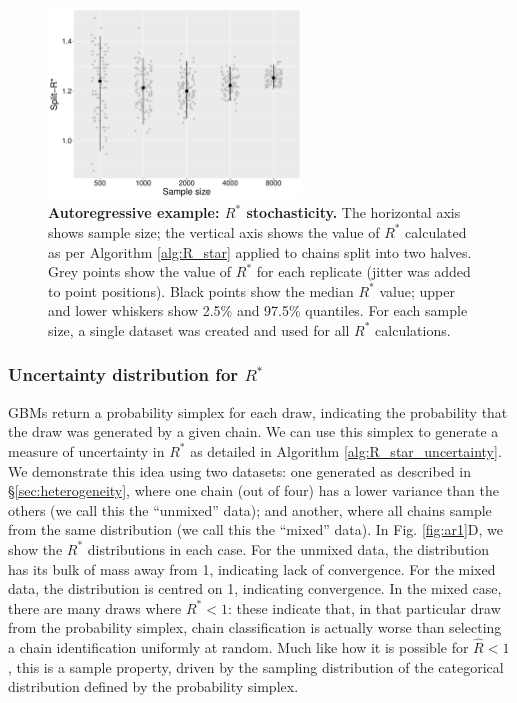 \documentclass[ba]{imsart}
\numberwithin{equation}{section}
\theoremstyle{plain}
\begin{document}
\begin{figure}[!htb]
	\centerline{\includegraphics[width=0.6\textwidth]{ar1_samplesize.pdf}}
	\caption{\textbf{Autoregressive example: $R^*$ stochasticity.} The horizontal axis shows sample size; the vertical axis shows the value of $R^*$ calculated as per Algorithm \ref{alg:R_star} applied to chains split into two halves. Grey points show the value of $R^*$ for each replicate (jitter was added to point positions). Black points show the median $R^*$ value; upper and lower whiskers show 2.5\% and 97.5\% quantiles. For each sample size, a single dataset was created and used for all $R^*$ calculations.}
	\label{fig:ar1_samplesize}
\end{figure}

\subsubsection{Uncertainty distribution for $R^*$}\label{sec:heterogeneity_uncertainty}
GBMs return a probability simplex for each draw, indicating the probability that the draw was generated by a given chain. We can use this simplex to generate a measure of uncertainty in $R^*$ as detailed in Algorithm \ref{alg:R_star_uncertainty}. We demonstrate this idea using two datasets: one generated as described in \S\ref{sec:heterogeneity}, where one chain (out of four) has a lower variance than the others (we call this the ``unmixed'' data); and another, where all chains sample from the same distribution (we call this the ``mixed'' data). In Fig. \ref{fig:ar1}D, we show the $R^*$ distributions in each case. For the unmixed data, the distribution has its bulk of mass away from 1, indicating lack of convergence. For the mixed data, the distribution is centred on 1, indicating convergence. In the mixed case, there are many draws where $R^*<1$: these indicate that, in that particular draw from the probability simplex, chain classification is actually worse than selecting a chain identification uniformly at random. Much like how it is possible for $\hat{R}<1$, this is a sample property, driven by the sampling distribution of the categorical distribution defined by the probability simplex.
\end{document}
